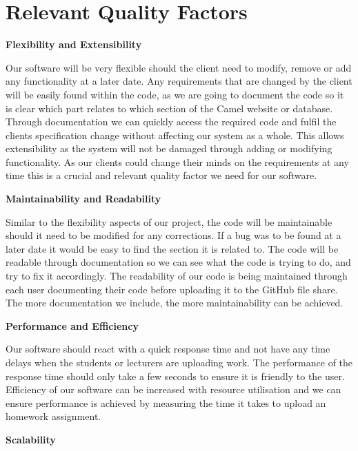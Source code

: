 \documentclass[12pt]{article}
\begin{document}
		\newpage
    
	\section{Relevant Quality Factors}
		\textbf{Flexibility and Extensibility}  

		Our software will be very flexible should the client need to modify, remove or add any functionality at a later date. Any requirements that are changed by the client will be easily found within the code, as we are going to document the code so it is clear which part relates to which section of the Camel website or database. Through documentation we can quickly access the required code and fulfil the clients specification change without affecting our system as a whole. This allows extensibility as the system will not be damaged through adding or modifying functionality. As our clients could change their minds on the requirements at any time this is a crucial and relevant quality factor we need for our software. 

	    \textbf{Maintainability and Readability}   
    
		Similar to the flexibility aspects of our project, the code will be maintainable should it need to be modified for any corrections. If a bug was to be found at a later date it would be easy to find the section it is related to. The code will be readable through documentation so we can see what the code is trying to do, and try to fix it accordingly. The readability of our code is being maintained through each user documenting their code before uploading it to the GitHub file share. The more documentation we include, the more maintainability can be achieved.

		\textbf{Performance and Efficiency} 
    
		Our software should react with a quick response time and not have any time delays when the students or lecturers are uploading work. The performance of the response time should only take a few seconds to ensure it is friendly to the user. Efficiency of our software can be increased with resource utilisation and we can ensure performance is achieved by measuring the time it takes to upload an homework assignment. 

		\newpage
    
	    \textbf{Scalability}   
    
\end{document}

